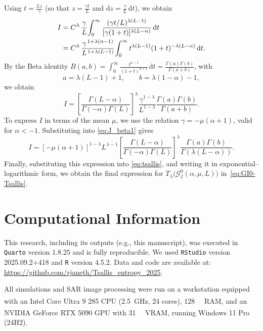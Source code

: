 \documentclass[
  lettersize  journal,
]{IEEEtran}%
\begin{document}
Using \(t = \frac{Lz}{\gamma}\) (so that \(z = \frac{\gamma t}{L}\) and
\(\mathrm{d}z = \frac{\gamma}{L}\,\mathrm{d}t\)), we obtain
\begin{align*}
I &= C^\lambda\,\frac{\gamma}{L}\!
\int_0^\infty \frac{(\gamma t/L)^{\lambda(L-1)}}{[\gamma(1+t)]^{\lambda(L-\alpha)}}\,\mathrm{d}t \notag\\
&= C^\lambda\,\frac{\gamma^{\,1+\lambda(\alpha-1)}}{L^{\,1+\lambda(L-1)}}\!
\int_0^\infty t^{\lambda(L-1)}(1+t)^{-\lambda(L-\alpha)}\,\mathrm{d}t.
\end{align*} By the Beta identity
\(B(a,b)=\int_0^\infty \tfrac{t^{a-1}}{(1+t)^{a+b}}\,\mathrm{d}t=\frac{\Gamma(a)\Gamma(b)}{\Gamma(a+b)}\),
with \[
a=\lambda(L-1)+1,\qquad b=\lambda(1-\alpha)-1,
\] we obtain \begin{equation}
I = \left[ \frac{\Gamma(L - \alpha)}{\Gamma(-\alpha) \Gamma(L)} \right]^\lambda 
\frac{\gamma^{1-\lambda}}{L^{1-\lambda}} 
\frac{\Gamma(a)\Gamma(b)}{\Gamma(a+b)}.
\label{eq:J_beta1}
\end{equation} To express \(I\) in terms of the mean \(\mu\), we use the
relation \(\gamma = -\mu(\alpha + 1)\), valid for \(\alpha < -1\).
Substituting into \eqref{eq:J_beta1} gives \begin{equation*}
I = [-\mu(\alpha + 1)]^{1-\lambda} L^{\lambda-1} 
\left[ \frac{\Gamma(L - \alpha)}{\Gamma(-\alpha) \Gamma(L)} \right]^\lambda 
\frac{\Gamma(a)\Gamma(b)}{\Gamma(\lambda(L - \alpha))}.
\end{equation*} Finally, substituting this expression into
\eqref{eq:tsallis}, and writing it in exponential--logarithmic form, we
obtain the final expression for
\(T_\lambda\bigl(\mathcal{G}^0_I(\alpha, \mu, L)\bigr)\)
in~\eqref{eq:GI0-Tsallis}.

\section*{Computational Information}\label{computational-information}

This research, including its outputs (e.g., this manuscript), was
executed in \texttt{Quarto} version 1.8.25 and is fully reproducible. We
used \texttt{RStudio} version 2025.09.2+418 and \texttt{R} version
4.5.2. Data and code are available at:
\url{https://github.com/rjaneth/Tsallis_entropy_2025}.

All simulations and SAR image processing were run on a workstation
equipped with an Intel\textsuperscript{\textregistered}
Core\texttrademark{} Ultra 9 285 CPU (\SI{2.5}{\giga\hertz}, 24 cores),
\SI{128}{\giga\byte} RAM, and an NVIDIA\textsuperscript{\textregistered}
GeForce RTX 5090 GPU with \SI{31}{\giga\byte} VRAM, running Windows 11
Pro (24H2).
\end{document}
